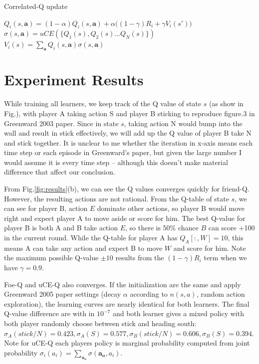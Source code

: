 \documentclass[conference]{IEEEtran}
\begin{document}
\begin{algorithm}[h!]
	\caption{Correlated-Q update}
	\begin{algorithmic}
			\State $Q_i(s, \mathbf{a}) = (1-\alpha) Q_i(s, \mathbf{a}) + \alpha  \big( (1-\gamma) R_i + \gamma V_i(s') \big)$
		\EndFor
		\State $\sigma(s, \mathbf{a}) = uCE(\{Q_1(s), Q_2(s)\dots Q_N(s)\})$ 
		\State $V_i(s) = \sum_{\mathbf{a}} Q_i(s, \mathbf{a}) \sigma(s, \mathbf{a})$
		\EndFor
		\EndFunction
	\end{algorithmic}
	\label{algo:ce-Q}
\end{algorithm}

\section{Experiment Results}
While training all learners, we keep track of the Q value of state $s$ (as show in Fig.), with player A taking action S and player B sticking to reproduce figure.3 in Greenward 2003 paper. Since in state $s$, taking action N would bump into the wall and result in stick effectively, we will add up the Q value of player B take N and stick together. It is unclear to me whether the iteration in x-axis means each time step or each episode in Greenward's paper, but given the large number I would assume it is every time step -- although this doesn't make material difference that affect our conclusion. 

From Fig.\ref{fig:results}(b), we can see the Q values converges quickly for friend-Q. However, the resulting actions are not rational. From the Q-table of state $s$, we can see for player B, action $E$ dominate other actions, so player B would move right and expect player A to move aside or score for him. The best Q-value for player B is both A and B take action $E$, so there is 50\% chance $B$ can score +100 in the current round. While the Q-table for player A has $Q_A[:, W]=10$, this means A can take any action and expect B to move $W$ and score for him. Note the maximum possible Q-value $\pm10$ results from the $(1-\gamma)R_i$ term when we have $\gamma=0.9$.

Foe-Q and uCE-Q also converges. If the initialization are the same and apply Greenward 2005 paper settings (decay $\alpha$ according to $n(s,a)$, random action exploration), the learning curves are nearly identical for both learners. The final Q-value difference are with in $10^{-7}$ and both learner gives a mixed policy with both player randomly choose between stick and heading south: $\sigma_A(stick/N)=0.423, \sigma_A(S)=0.577, \sigma_B(stick/N)=0.606, \sigma_B(S)=0.394$. Note for uCE-Q each players policy is  marginal probability computed from joint probability $\sigma_i(a_i) = \sum_{\mathbf{a_o}}\sigma(\mathbf{a_o}, a_i)$.
\end{document}
